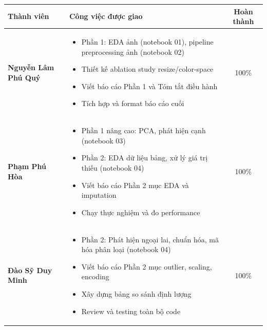 \documentclass[12pt,a4paper]{article}
\let\oldtextbf\textbf
\renewcommand{\textbf}[1]{\oldtextbf{\textcolor{hcmublue}{#1}}}
\begin{document}
\begin{table}[H]
\centering
\small
\begin{tabularx}{\textwidth}{|l|X|c|}
\hline
\textbf{Thành viên} & \textbf{Công việc được giao} & \textbf{Hoàn thành} \\ \hline

\textbf{Nguyễn Lâm Phú Quý} &
\begin{minipage}[t]{\linewidth}
\begin{itemize}[leftmargin=*,nosep,after=\strut]
    \item[-] Phần 1: EDA ảnh (notebook 01), pipeline preprocessing ảnh (notebook 02)
    \item[-] Thiết kế ablation study resize/color-space
    \item[-] Viết báo cáo Phần 1 và Tóm tắt điều hành
    \item[-] Tích hợp và format báo cáo cuối
\end{itemize}
\end{minipage} & 100\% \\ \hline

\textbf{Phạm Phú Hòa} &
\begin{minipage}[t]{\linewidth}
\begin{itemize}[leftmargin=*,nosep,after=\strut]
    \item[-] Phần 1 nâng cao: PCA, phát hiện cạnh (notebook 03)
    \item[-] Phần 2: EDA dữ liệu bảng, xử lý giá trị thiếu (notebook 04)
    \item[-] Viết báo cáo Phần 2 mục EDA và imputation
    \item[-] Chạy thực nghiệm và đo performance
\end{itemize}
\end{minipage} & 100\% \\ \hline

\textbf{Đào Sỹ Duy Minh} &
\begin{minipage}[t]{\linewidth}
\begin{itemize}[leftmargin=*,nosep,after=\strut]
    \item[-] Phần 2: Phát hiện ngoại lai, chuẩn hóa, mã hóa phân loại (notebook 04)
    \item[-] Viết báo cáo Phần 2 mục outlier, scaling, encoding
    \item[-] Xây dựng bảng so sánh định lượng
    \item[-] Review và testing toàn bộ code
\end{itemize}
\end{minipage} & 100\% \\ \hline


\end{tabularx}
\end{table}
\end{document}
